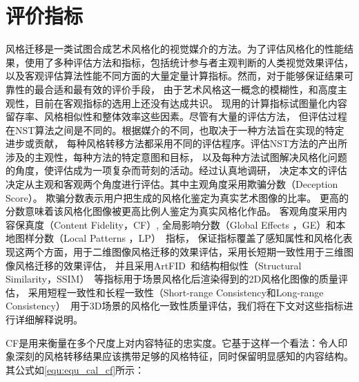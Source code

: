 \section{评价指标}
风格迁移是一类试图合成艺术风格化的视觉媒介的方法。为了评估风格化的性能结果，使用了多种评估方法和指标，包括统计参与者主观判断的人类视觉效果评估，
以及客观评估算法性能不同方面的大量定量计算指标。然而，对于能够保证结果可靠性的最合适和最有效的评价手段，
由于艺术风格这一概念的模糊性，和高度主观性，目前在客观指标的选用上还没有达成共识。
现用的计算指标试图量化内容留存率、风格相似性和整体效率这些因素。尽管有大量的评估方法，
但评估过程在NST算法之间是不同的。根据媒介的不同，也取决于一种方法旨在实现的特定进步或贡献，
每种风格转移方法都采用不同的评估程序。评估NST方法的产出所涉及的主观性，每种方法的特定意图和目标，
以及每种方法试图解决风格化问题的角度，使评估成为一项复杂而苛刻的活动。经过认真地调研，
决定本文的评估决定从主观和客观两个角度进行评估。其中主观角度采用欺骗分数（Deception Score）。
欺骗分数表示用户把生成的风格化鉴定为真实艺术图像的比率。
更高的分数意味着该风格化图像被更高比例人鉴定为真实风格化作品。
客观角度采用内容保真度（Content Fidelity，CF）, 全局影响分数（Global Effects ，GE）和本地图样分数（Local Patterns ，LP）~\cite{wang2021evaluate}指标，
保证指标覆盖了感知属性和风格化表现这两个方面，用于二维图像风格迁移的效果评估，采用长短期一致性用于三维图像风格迁移的效果评估，
并且采用ArtFID~\cite{wright2022artfid}和结构相似性（Structural Similarity，SSIM）~\cite{wang2004image}等指标用于场景风格化后渲染得到的2D风格化图像的质量评估，
采用短程一致性和长程一致性（Short-range Consistency和Long-range Consistency）~\cite{lai2018learning}用于3D场景的风格化一致性质量评估，我们将在下文对这些指标进行详细解释说明。
\par CF是用来衡量在多个尺度上对内容特征的忠实度。它基于这样一个看法：令人印象深刻的风格转移结果应该携带足够的风格特征，同时保留明显感知的内容结构。其公式如\autoref{equ:equ_cal_cf}所示：

